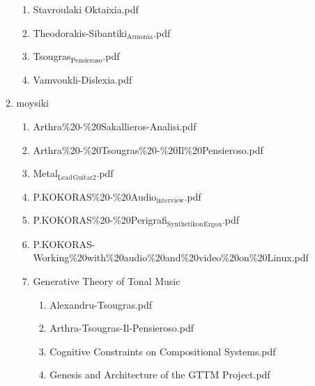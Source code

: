 \documentclass[11pt]{article}
\begin{document}
\begin{enumerate}
\begin{enumerate}
\begin{enumerate}
\item Stavroulaki Oktaixia.pdf
\label{sec-1-1-1-1-49-2-2-1-72-27}

\item Theodorakis-Sibantiki$_{\text{Armonia}}$.pdf
\label{sec-1-1-1-1-49-2-2-1-72-28}

\item Tsougras$_{\text{Pensieroso}}$.pdf
\label{sec-1-1-1-1-49-2-2-1-72-29}

\item Vamvoukli-Dislexia.pdf
\label{sec-1-1-1-1-49-2-2-1-72-30}
\end{enumerate}

\item moysiki
\label{sec-1-1-1-1-49-2-2-1-73}
\begin{enumerate}
\item Arthra\%20-\%20Sakallieros-Analisi.pdf
\label{sec-1-1-1-1-49-2-2-1-73-1}

\item Arthra\%20-\%20Tsougras\%20-\%20Il\%20Pensieroso.pdf
\label{sec-1-1-1-1-49-2-2-1-73-2}

\item Metal$_{\text{Lead}}$$_{\text{Guitar2}}$.pdf
\label{sec-1-1-1-1-49-2-2-1-73-3}

\item P.KOKORAS\%20-\%20Audio$_{\text{interview}}$.pdf
\label{sec-1-1-1-1-49-2-2-1-73-4}

\item P.KOKORAS\%20-\%20Perigrafi$_{\text{Synthetikou}}$$_{\text{Ergou}}$.pdf
\label{sec-1-1-1-1-49-2-2-1-73-5}

\item P.KOKORAS-Working\%20with\%20audio\%20and\%20video\%20on\%20Linux.pdf
\label{sec-1-1-1-1-49-2-2-1-73-6}

\item Generative Theory of Tonal Music
\label{sec-1-1-1-1-49-2-2-1-73-7}
\begin{enumerate}
\item Alexandru-Tsougras.pdf
\label{sec-1-1-1-1-49-2-2-1-73-7-1}

\item Arthra-Tsougras-Il-Pensieroso.pdf
\label{sec-1-1-1-1-49-2-2-1-73-7-2}

\item Cognitive Constraints on Compositional Systems.pdf
\label{sec-1-1-1-1-49-2-2-1-73-7-3}

\item Genesis and Architecture of the GTTM Project.pdf
\label{sec-1-1-1-1-49-2-2-1-73-7-4}


\end{enumerate}
\end{enumerate}
\end{enumerate}
\end{enumerate}
\end{document}
